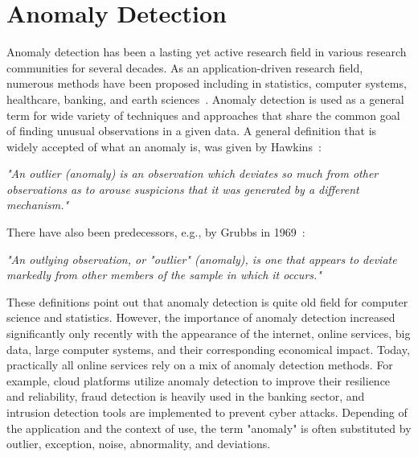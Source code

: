 \section{Anomaly Detection}
Anomaly detection has been a lasting yet active research field in various research communities for several decades. As an application-driven research field, numerous methods have been proposed including in statistics, computer systems, healthcare, banking, and earth sciences~\cite{Aggarwal:2013:OA:2436823}. Anomaly detection is used as a general term for wide variety of techniques and approaches that share the common goal of finding unusual observations in a given data. A general definition that is widely accepted of what an anomaly is, was given by Hawkins~\cite{hawkins1980identification}:

\begin{center}
\textit{
"An outlier (anomaly) is an observation which deviates so much from
other observations as to arouse suspicions that it was generated by a
different mechanism."}
\end{center}

There have also been predecessors, e.g., by Grubbs in 1969~\cite{grubbs1969procedures}:

\begin{center}\textit{ 
"An outlying observation, or "outlier" (anomaly), is one that appears to deviate markedly from other members of the sample in which it occurs."}   
\end{center}

These definitions point out that anomaly detection is quite old field for computer science and statistics. However, the importance of anomaly detection increased significantly only recently with the appearance of the internet, online services, big data, large computer systems, and their corresponding economical impact. Today, practically all online services rely on a mix of anomaly detection methods. For example, cloud platforms utilize anomaly detection to improve their resilience and reliability, fraud detection is heavily used in the banking sector, and intrusion detection tools are implemented to prevent cyber attacks. Depending of the application and the context of use, the term "anomaly" is often substituted by outlier, exception, noise, abnormality, and deviations. 

